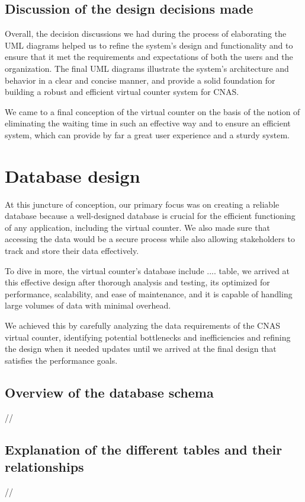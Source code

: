 \subsection{Discussion of the design decisions made}
Overall, the decision discussions we had during the process of elaborating the UML diagrams helped us to refine the system's design and functionality and to ensure that it met the requirements and expectations of both the users and the organization. The final UML diagrams illustrate the system's architecture and behavior in a clear and concise manner, and provide a solid foundation for building a robust and efficient virtual counter system for CNAS.

\medskip We came to a final conception of the virtual counter on the basis of the notion of eliminating the waiting time in such an effective way and to ensure an efficient system, which can provide by far a great user experience and a sturdy system. 
\newpage
\section{Database design}
At this juncture of conception, our primary focus was on creating a reliable database because a well-designed database is crucial for the efficient functioning of any application, including the virtual counter. We also made sure that accessing the data would be a secure process while also allowing stakeholders to track and store their data effectively.

\medskip To dive in more, the virtual counter's database include .... table, we arrived at this effective design after thorough analysis and testing, its optimized for performance, scalability, and ease of maintenance, and it is capable of handling large volumes of data with minimal overhead.   

We achieved this by carefully analyzing the data requirements of the CNAS virtual counter, identifying potential bottlenecks and inefficiencies and refining the design when it needed updates until we arrived at the final design that satisfies the performance goals. 
\subsection{Overview of the database schema}
//
\subsection{Explanation of the different tables and their relationships}
//
